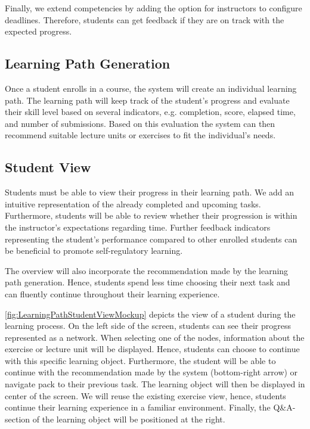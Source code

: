 \documentclass[a4paper,12pt,twoside]{article}
\begin{document}
Finally, we extend competencies by adding the option for instructors to configure deadlines. Therefore, students can get feedback if they are on track with the
expected progress.

\subsection{Learning Path Generation}
Once a student enrolls in a course, the system will create an individual learning path. The learning path will keep track of the student's progress and evaluate
their skill level based on several indicators, e.g. completion, score, elapsed time, and number of submissions. Based on this evaluation the system can then
recommend suitable lecture units or exercises to fit the individual's needs.

\subsection{Student View}
Students must be able to view their progress in their learning path. We add an intuitive representation of the already completed and upcoming tasks.
Furthermore, students will be able to review whether their progression is within the instructor's expectations regarding time. Further feedback indicators
representing the student's performance compared to other enrolled students can be beneficial to promote self-regulatory learning.

The overview will also incorporate the recommendation made by the learning path generation. Hence, students spend less time choosing their next task and can fluently
continue throughout their learning experience.

\autoref{fig:LearningPathStudentViewMockup} depicts the view of a student during the learning process. On the left side of the screen, students can see their
progress represented as a network. When selecting one of the nodes, information about the exercise or lecture unit will be displayed. Hence, students can choose
to continue with this specific learning object. Furthermore, the student will be able to continue with the recommendation made by the system (bottom-right arrow)
or navigate pack to their previous task.
The learning object will then be displayed in center of the screen. We will reuse the existing exercise view, hence, students continue their learning experience in
a familiar environment. Finally, the Q\&A-section of the learning object will be positioned at the right.
\end{document}
